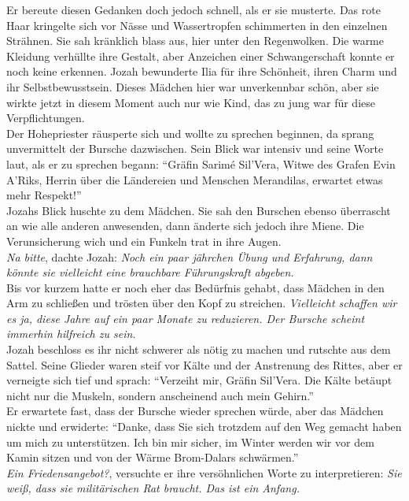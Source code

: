 Er bereute diesen Gedanken doch jedoch schnell, als er sie musterte. Das rote Haar kringelte sich 
vor Nässe und Wassertropfen schimmerten in den einzelnen Strähnen. Sie sah kränklich blass aus, 
hier unter den Regenwolken. Die warme Kleidung verhüllte ihre Gestalt, aber Anzeichen einer 
Schwangerschaft konnte er noch keine erkennen. Jozah bewunderte Ilia für ihre Schönheit, ihren 
Charm und ihr Selbstbewusstsein. Dieses Mädchen hier war unverkennbar schön, aber sie wirkte jetzt 
in diesem Moment auch nur wie Kind, das zu jung war für diese Verpflichtungen.\\
Der Hohepriester räusperte sich und wollte zu sprechen beginnen, da sprang unvermittelt der Bursche 
dazwischen. Sein Blick war intensiv und seine Worte laut, als er zu sprechen begann: ``Gräfin 
Sarimé Sil'Vera, Witwe des Grafen Evin A'Riks, Herrin über die Ländereien und Menschen Merandilas, 
erwartet etwas mehr Respekt!''\\
Jozahs Blick huschte zu dem Mädchen. Sie sah den Burschen ebenso überrascht an wie alle anderen 
anwesenden, dann änderte sich jedoch ihre Miene. Die Verunsicherung wich und ein Funkeln trat in 
ihre Augen.\\
\textit{Na bitte}, dachte Jozah: \textit{Noch ein paar jährchen Übung und Erfahrung, dann könnte 
sie vielleicht eine brauchbare Führungskraft abgeben.}\\
Bis vor kurzem hatte er noch eher das Bedürfnis gehabt, dass Mädchen in den Arm zu schließen und 
trösten über den Kopf zu streichen. \textit{Vielleicht schaffen wir es ja, diese Jahre auf ein paar 
Monate zu reduzieren. Der Bursche scheint immerhin hilfreich zu sein.}\\
Jozah beschloss es ihr nicht schwerer als nötig zu machen und rutschte aus dem Sattel. Seine 
Glieder waren steif vor Kälte und der Anstrenung des Rittes, aber er verneigte sich tief und 
sprach: ``Verzeiht mir, Gräfin Sil'Vera. Die Kälte betäupt nicht nur die Muskeln, sondern 
anscheinend auch mein Gehirn.''\\
Er erwartete fast, dass der Bursche wieder sprechen würde, aber das Mädchen nickte und erwiderte: 
``Danke, dass Sie sich trotzdem auf den Weg gemacht haben um mich zu unterstützen. Ich bin mir 
sicher, im Winter werden wir vor dem Kamin sitzen und von der Wärme Brom-Dalars schwärmen.''\\
\textit{Ein Friedensangebot?}, versuchte er ihre versöhnlichen Worte zu interpretieren: \textit{Sie 
weiß, dass sie militärischen Rat braucht. Das ist ein Anfang.}\\
